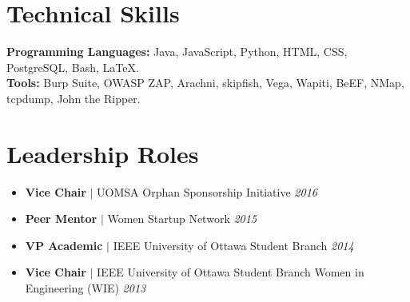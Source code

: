 \documentclass[letterpaper,11pt]{article}
\newcommand{\resumeItem}{
  \item\small{
    { \vspace{-2pt}}
  }
}
\newcommand{\resumeSubItem}{\resumeItem\vspace{-4pt}}
\newcommand{\resumeSubHeadingListStart}{\begin{itemize}[leftmargin=*]}
\newcommand{\resumeSubHeadingListEnd}{\end{itemize}}
\begin{document}
  
\section{Technical Skills}
\textbf{Programming Languages:} Java, JavaScript, Python, HTML, CSS, PostgreSQL, Bash, LaTeX.\\
\textbf{Tools:}  Burp Suite, OWASP ZAP, Arachni, skipfish, Vega, Wapiti, BeEF, NMap, tcpdump, John the Ripper.

\section{Leadership Roles}
  \resumeSubHeadingListStart
  \vspace{4px}
    \resumeSubItem
      {\textbf{Vice Chair} $\vert$ UOMSA Orphan Sponsorship Initiative \null\hfill \it{2016}} 
    \resumeSubItem
      {\textbf{Peer Mentor} $\vert$ Women Startup Network \null\hfill \it{2015}}
    \resumeSubItem
      {\textbf{VP Academic} $\vert$ IEEE University of Ottawa Student Branch \null\hfill \it{2014}}
    \resumeSubItem
      {\textbf{Vice Chair} $\vert$ IEEE University of Ottawa Student Branch Women in Engineering (WIE) \null\hfill \it{2013}}
  \resumeSubHeadingListEnd


\begin{comment}
\section{Scholarships and Certificates}
\begin{itemize}
    \item Seeds for the Future 2017 - Huawei Canada
    \item Women Startup Network Peer Mentorship Award
    \item Undergraduate Research Opportunity Program (UROP) Scholarship Award
    \item University of Ottawa Admission Scholarship
\end{itemize}
\end{comment}
\begin{comment}
\tiny \textcolor{white}{knowledge of networking and operating systems (Linux and Windows), configuration and administration
experience using security scanning tools (e.g., Nmap, Nessus, Nexpose, etc.)
in-depth understanding of technical vulnerability assessment and penetration testing (automated and manual tools and methodology)
knowledge of web application security concepts, as well as testing tools and methodology
understanding of secure code development principles and practices
coding and scripting experience}
\end{comment}
\end{document}

